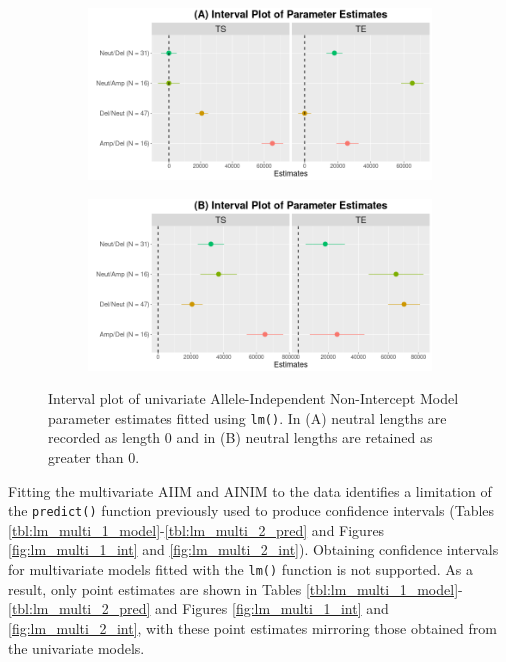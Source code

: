 \begin{figure}[H]
\vspace{0.7cm}
     \begin{subfigure}[t]{.49\textwidth}
      \centering
      \includegraphics[width = 1\textwidth]{../figures/Chapter_5/Univariate_lm_6_AI_Interval.png}
    \end{subfigure}%
     \begin{subfigure}[t]{.49\textwidth}
      \centering
       \includegraphics[width = 1\textwidth]{../figures/Chapter_5/Univariate_lm_6_Neut_AI_Interval.png}
    \end{subfigure} 
     \caption[Interval plot of univariate Allele-Independent Non-Intercept Model parameter estimates fitted using \texttt{lm()}.]{Interval plot of univariate Allele-Independent Non-Intercept Model parameter estimates fitted using \texttt{lm()}. In (A) neutral lengths are recorded as length 0 and in (B) neutral lengths are retained as greater than 0.}
     \label{fig:lm_uni_2_int}
\end{figure}
\vfill 

\clearpage

Fitting the multivariate AIIM and AINIM to the data identifies a limitation of the \texttt{predict()} function previously used to produce confidence intervals (Tables \ref{tbl:lm_multi_1_model}-\ref{tbl:lm_multi_2_pred} and Figures \ref{fig:lm_multi_1_int} and \ref{fig:lm_multi_2_int}). Obtaining confidence intervals for multivariate models fitted with the \texttt{lm()} function is not supported. As a result, only point estimates are shown in Tables \ref{tbl:lm_multi_1_model}-\ref{tbl:lm_multi_2_pred} and Figures \ref{fig:lm_multi_1_int} and \ref{fig:lm_multi_2_int}, with these point estimates mirroring those obtained from the univariate models.  


